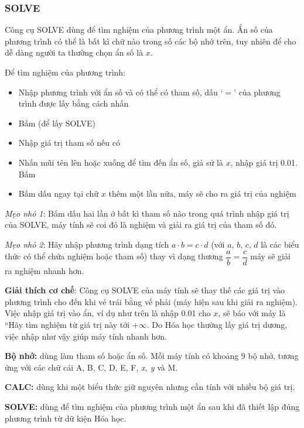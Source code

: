 \subsubsection*{SOLVE}
Công cụ SOLVE dùng để tìm nghiệm của phương trình một ẩn. Ẩn số của phương trình có thể là bất kì chữ nào trong số các bộ nhớ trên, tuy nhiên để cho dễ dàng người ta thường chọn ẩn số là $x$.

Để tìm nghiệm của phương trình:
\begin{itemize}
	\item Nhập phương trình với ẩn số và có thể có tham số, dấu `$=$' của phương trình được lấy bằng cách nhấn  
	\item Bấm   (để lấy SOLVE)
	\item Nhập giá trị tham số nếu có
	\item Nhấn mũi tên lên hoặc xuống để tìm đến ẩn số, giả sử là $x$, nhập giá trị \num{0.01}. Bấm \fbox{$=$}
	\item Bấm dấu \fbox{$=$} ngay tại chữ $x$ thêm một lần nữa, máy sẽ cho ra giá trị của nghiệm
\end{itemize}
\emph{Mẹo nhỏ 1}: Bấm dấu \fbox{$=$} hai lần ở bất kì tham số nào trong quá trình nhập giá trị của SOLVE, máy tính sẽ coi đó là nghiệm và giải ra giá trị của tham số đó.

\emph{Mẹo nhỏ 2}: Hãy nhập phương trình dạng tích $a \cdot b = c \cdot d$ (với $a,\, b,\, c,\, d$ là các biểu thức có thể chứa nghiệm hoặc tham số) thay vì dạng thương $\dfrac{a}{b} = \dfrac{c}{d}$ máy sẽ giải ra nghiệm nhanh hơn.

\textbf{Giải thích cơ chế}: Công cụ SOLVE của máy tính sẽ thay thế các giá trị vào phương trình cho đến khi vé trái bằng vế phải (máy hiện  sau khi giải ra nghiệm). Việc nhập giá trị vào ẩn, ví dụ như trên là nhập \num{0.01} cho $x$, sẽ báo với máy là ``Hãy tìm nghiệm từ giá trị này tới $+\infty$. Do Hóa học thường lấy giá trị dương, việc nhập như vậy giúp máy tính nhanh hơn.

\begin{casiobox}
\textbf{Bộ nhớ:} dùng làm tham số hoặc ẩn số. Mỗi máy tính có khoảng 9 bộ nhớ, tương ứng với các chữ cái \textsc{A, B, C, D, E, F}, \textit{x, y} và \textsc{M}.\par
\textbf{CALC:} dùng khi một biểu thức giữ nguyên nhưng cần tính với nhiều bộ giá trị.\par
\textbf{SOLVE:} dùng để tìm nghiệm của phương trình một ẩn sau khi đã thiết lập đúng phương trình từ dữ kiện Hóa học.\par
\end{casiobox}

